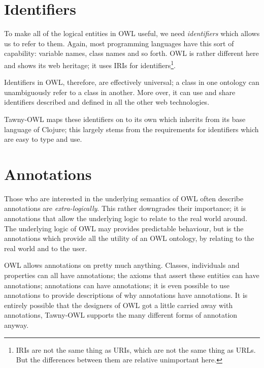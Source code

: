 \section{Identifiers}

To make all of the logical entities in OWL useful, we need
\emph{identifiers} which allows us to refer to them. Again, most
programming languages have this sort of capability: variable names,
class names and so forth. OWL is rather different here and shows its
web heritage; it uses IRIs for identifiers\footnote{IRIs are not the
  same thing as URIs, which are not the same thing as URLs. But the
  differences between them are relative unimportant here.}.

Identifiers in OWL, therefore, are effectively universal; a class in
one ontology can unambiguously refer to a class in another. More over,
it can use and share identifiers described and defined in all the
other web technologies.

Tawny-OWL maps these identifiers on to its own which inherits from its
base language of Clojure; this largely stems from the requirements for
identifiers which are easy to type and use.


\section{Annotations}

Those who are interested in the underlying semantics of OWL often
describe annotations are \emph{extra-logically}. This rather
downgrades their importance; it is annotations that allow the
underlying logic to relate to the real world around. The underlying
logic of OWL may provides predictable behaviour, but is the
annotations which provide all the utility of an OWL ontology, by
relating to the real world and to the user.

OWL allows annotations on pretty much anything. Classes, individuals
and properties can all have annotations; the axioms that assert these
entities can have annotations; annotations can have annotations; it is
even possible to use annotations to provide descriptions of why
annotations have annotations. It is entirely possible that the
designers of OWL got a little carried away with annotations, Tawny-OWL
supports the many different forms of annotation anyway.
